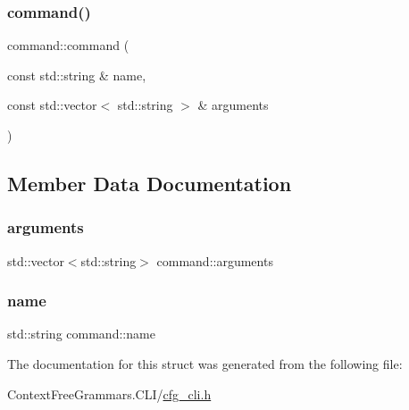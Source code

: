 \mbox{\label{structcommand_a123d32fbc6e9ef2c5428a6c262cb103e}} 
\subsubsection{\texorpdfstring{command()}{command()}\hspace{0.1cm}{\footnotesize\ttfamily [2/2]}}
{\footnotesize\ttfamily command\+::command (\begin{DoxyParamCaption}\item[{const std\+::string \&}]{name,  }\item[{const std\+::vector$<$ std\+::string $>$ \&}]{arguments }\end{DoxyParamCaption})\hspace{0.3cm}{\ttfamily [inline]}}



\subsection{Member Data Documentation}
\mbox{\label{structcommand_a97c554ee8ed96d32c6cc180574d6c63d}} 
\subsubsection{\texorpdfstring{arguments}{arguments}}
{\footnotesize\ttfamily std\+::vector$<$std\+::string$>$ command\+::arguments}

\mbox{\label{structcommand_a4318703934a246cbc84031bb6a705bf0}} 
\subsubsection{\texorpdfstring{name}{name}}
{\footnotesize\ttfamily std\+::string command\+::name}



The documentation for this struct was generated from the following file\+:\begin{DoxyCompactItemize}
\item 
Context\+Free\+Grammars.\+C\+L\+I/\mbox{\hyperlink{cfg__cli_8h}{cfg\+\_\+cli.\+h}}\end{DoxyCompactItemize}
